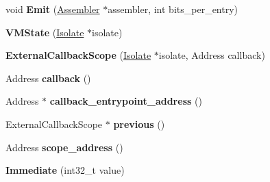 \begin{DoxyCompactItemize}
\item 
void {\bfseries Emit} (\hyperlink{classv8_1_1internal_1_1_assembler}{Assembler} $\ast$assembler, int bits\+\_\+per\+\_\+entry)\hypertarget{classv8_1_1internal_1_1_b_a_s_e___e_m_b_e_d_d_e_d_aa8449b77cbb4ac987386f9c46a244503}{}\label{classv8_1_1internal_1_1_b_a_s_e___e_m_b_e_d_d_e_d_aa8449b77cbb4ac987386f9c46a244503}

\item 
{\bfseries V\+M\+State} (\hyperlink{classv8_1_1internal_1_1_isolate}{Isolate} $\ast$isolate)\hypertarget{classv8_1_1internal_1_1_b_a_s_e___e_m_b_e_d_d_e_d_a37f02640fb9f66109ce1a11dde1dd9e3}{}\label{classv8_1_1internal_1_1_b_a_s_e___e_m_b_e_d_d_e_d_a37f02640fb9f66109ce1a11dde1dd9e3}

\item 
{\bfseries External\+Callback\+Scope} (\hyperlink{classv8_1_1internal_1_1_isolate}{Isolate} $\ast$isolate, Address callback)\hypertarget{classv8_1_1internal_1_1_b_a_s_e___e_m_b_e_d_d_e_d_a83a32048fbb852d6011d1d5395449bf8}{}\label{classv8_1_1internal_1_1_b_a_s_e___e_m_b_e_d_d_e_d_a83a32048fbb852d6011d1d5395449bf8}

\item 
Address {\bfseries callback} ()\hypertarget{classv8_1_1internal_1_1_b_a_s_e___e_m_b_e_d_d_e_d_a039565d6f9efbdfdf276162cb04968c2}{}\label{classv8_1_1internal_1_1_b_a_s_e___e_m_b_e_d_d_e_d_a039565d6f9efbdfdf276162cb04968c2}

\item 
Address $\ast$ {\bfseries callback\+\_\+entrypoint\+\_\+address} ()\hypertarget{classv8_1_1internal_1_1_b_a_s_e___e_m_b_e_d_d_e_d_abc2656e055bb93a35134cfed097700dd}{}\label{classv8_1_1internal_1_1_b_a_s_e___e_m_b_e_d_d_e_d_abc2656e055bb93a35134cfed097700dd}

\item 
External\+Callback\+Scope $\ast$ {\bfseries previous} ()\hypertarget{classv8_1_1internal_1_1_b_a_s_e___e_m_b_e_d_d_e_d_a99f4bc7563eee659e9092057be678504}{}\label{classv8_1_1internal_1_1_b_a_s_e___e_m_b_e_d_d_e_d_a99f4bc7563eee659e9092057be678504}

\item 
Address {\bfseries scope\+\_\+address} ()\hypertarget{classv8_1_1internal_1_1_b_a_s_e___e_m_b_e_d_d_e_d_a5be1e7fd79d8ce220ea72208a4a4ae64}{}\label{classv8_1_1internal_1_1_b_a_s_e___e_m_b_e_d_d_e_d_a5be1e7fd79d8ce220ea72208a4a4ae64}

\item 
{\bfseries Immediate} (int32\+\_\+t value)\hypertarget{classv8_1_1internal_1_1_b_a_s_e___e_m_b_e_d_d_e_d_a32993f640d2174db2655eac9eb5cde46}{}\label{classv8_1_1internal_1_1_b_a_s_e___e_m_b_e_d_d_e_d_a32993f640d2174db2655eac9eb5cde46}


\end{DoxyCompactItemize}
